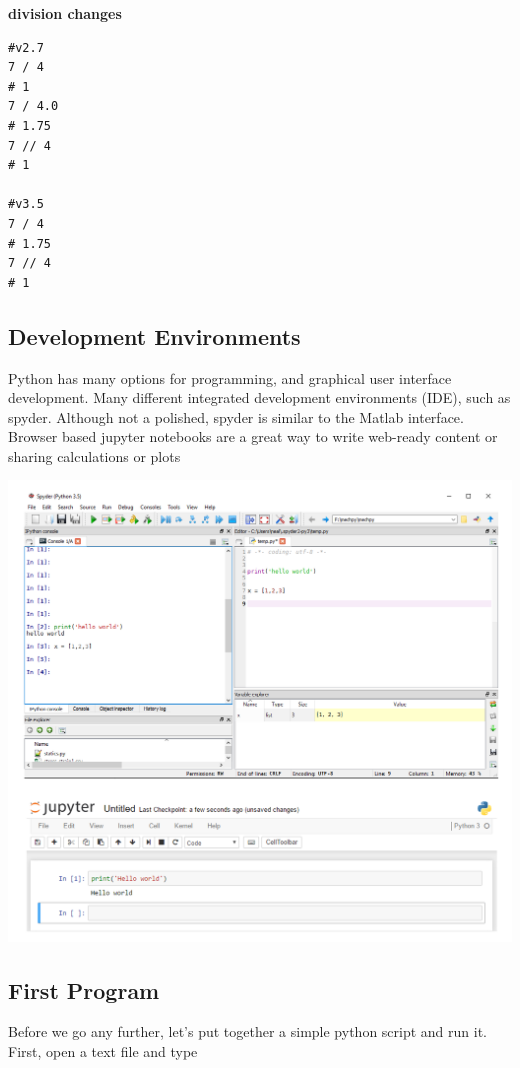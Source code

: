 \documentclass[%
oneside,                 %
final,                   %
10pt]{article}
\begin{document}
\textbf{division changes}
\begin{verbatim}
#v2.7
7 / 4
# 1
7 / 4.0
# 1.75
7 // 4
# 1

#v3.5
7 / 4
# 1.75
7 // 4
# 1
\end{verbatim}

\subsection{Development Environments}

Python has many options for programming, and graphical user interface development. Many different integrated development environments (IDE), such as spyder. Although not a polished, spyder is similar to the Matlab interface. Browser based jupyter notebooks are a great way to write web-ready content or sharing calculations or plots



\centerline{\includegraphics[width=0.9\linewidth]{fig/jupyterspyder.png}}




\subsection{First Program}

Before we go any further, let's put together a simple python script and run it. First, open a text file and type
\end{document}
